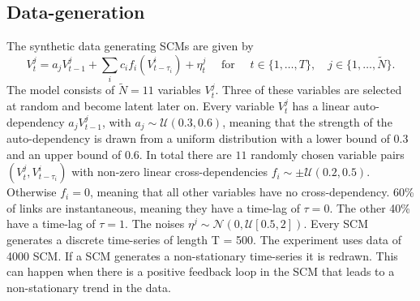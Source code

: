 \documentclass[conference]{IEEEtran}
\begin{document}
\subsection{Data-generation}
The synthetic data generating SCMs are given by
\begin{equation}
V_{t}^{j}=a_{j} V_{t-1}^{j}+\sum_{i} c_{i} f_{i}\left(V_{t-\tau_{i}}^{i}\right)+\eta_{t}^{j} \quad \text { for } \quad t \in\{1, \ldots, T\}, \quad j \in\{1, \ldots, \tilde{N} \}.
\end{equation}
The model consists of $\tilde{N}=11$ variables $V_t^j$. Three of these variables are selected at random and become latent later on.
Every variable $V_t^j$ has a linear auto-dependency $a_j V_{t-1}^{j}$, with $a_j \sim \mathcal{U}(0.3,0.6)$, meaning that the strength of the auto-dependency is drawn from a uniform distribution with a lower bound of 0.3 and an upper bound of 0.6.
In total there are $11$ randomly chosen variable pairs $(V_t^j,V^i_{t-\tau_i})$ with non-zero linear cross-dependencies $f_i \sim \pm \mathcal{U}(0.2,0.5)$. Otherwise $f_i=0$, meaning that all other variables have no cross-dependency.
60\% of links are instantaneous, meaning they have a time-lag of $\tau =0$. The other 40\% have a time-lag of $\tau=1$.
The noises $\eta^{j} \sim \mathcal{N}(0,\mathcal{U}[0.5,2])$.
Every SCM generates a discrete time-series of length T = 500. The experiment uses data of 4000 SCM. If a SCM generates a non-stationary time-series it is redrawn. This can happen when there is a positive feedback loop in the SCM that leads to a non-stationary trend in the data.
\end{document}
